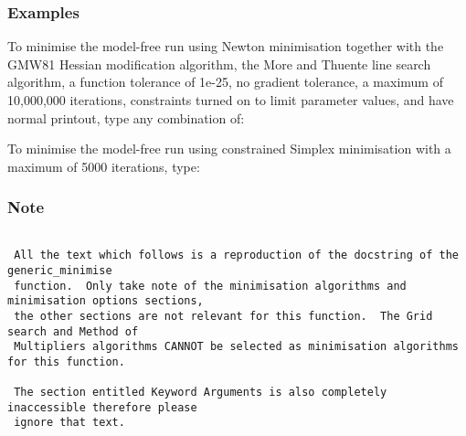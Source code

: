   
 \subsubsection{Examples} 

 To minimise the model-free run  using Newton minimisation together with the GMW81 Hessian modification algorithm, the More and Thuente line search algorithm, a function tolerance of 1e-25, no gradient tolerance, a maximum of 10,000,000 iterations, constraints turned on to limit parameter values, and have normal printout, type any combination of: 
  












 To minimise the model-free run  using constrained Simplex minimisation with a maximum of 5000 iterations, type: 
  


  
 \subsubsection{Note} 

 {\footnotesize \begin{verbatim} 
  
 All the text which follows is a reproduction of the docstring of the generic_minimise 
 function.  Only take note of the minimisation algorithms and minimisation options sections, 
 the other sections are not relevant for this function.  The Grid search and Method of 
 Multipliers algorithms CANNOT be selected as minimisation algorithms for this function. 
  
 The section entitled Keyword Arguments is also completely inaccessible therefore please 
 ignore that text. 
  
 \end{verbatim}} 


